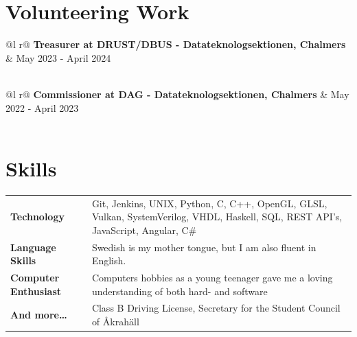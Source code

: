 \documentclass[a4paper,12pt]{article}
\begin{document}
\section{Volunteering Work}

\begin{tabularx}{\linewidth}{ @{}l r@{} }
    \textbf{Treasurer at \textbf{DRUST/DBUS - Datateknologsektionen, Chalmers}} & \hfill May 2023 - April 2024 \\[3.75pt]
      \\
    \end{tabularx}

\begin{tabularx}{\linewidth}{ @{}l r@{} }
\textbf{Commissioner at \textbf{DAG - Datateknologsektionen, Chalmers}} & \hfill May 2022 - April 2023  \\[3.75pt]
  \\
\end{tabularx}




\section{Skills}

\begin{tabularx}{\linewidth}{@{}l X@{}}
\textbf{Technology} &  \normalsize{Git, Jenkins, UNIX, Python, C, C++, OpenGL, GLSL, Vulkan, SystemVerilog, VHDL, Haskell, SQL, REST API's, JavaScript, Angular, C\#}\\
\textbf{Language Skills}  &  \normalsize{Swedish is my mother tongue, but I am also fluent in English.}\\
\textbf{Computer Enthusiast}  &  \normalsize{Computers hobbies as a young teenager gave me a loving understanding of both hard- and software} \\
\textbf{And more\dots}  &  \normalsize{Class B Driving License, Secretary for the Student Council of Åkrahäll}
\end{tabularx}

\vfill
\end{document}
